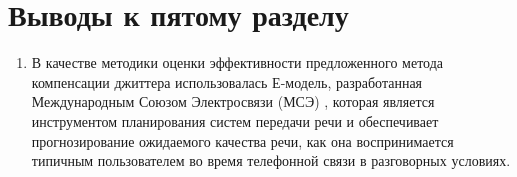\section{Выводы к пятому разделу} \label{sect:concl4}
\begin{enumerate}
 \item %
 В качестве методики оценки эффективности предложенного метода компенсации джиттера использовалась Е-модель, разработанная Международным Союзом Электросвязи (МСЭ) \cite{G107}, 
 которая является инструментом планирования систем передачи речи и обеспечивает прогнозирование ожидаемого качества речи, 
 как она воспринимается типичным пользователем во время телефонной связи в разговорных условиях.
 

\end{enumerate}
